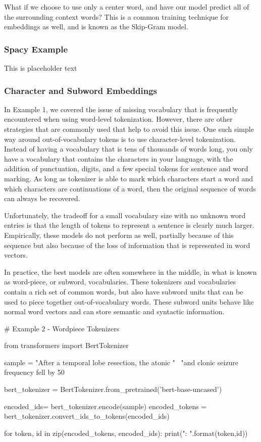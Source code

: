 What if we choose to use only a center word, and have our model predict all of the surrounding context words?
This is a common training technique for embeddings as well, and is known as the Skip-Gram model.

\subsubsection{Spacy Example}
This is placeholder text

\subsubsection{Character and Subword Embeddings}

In Example 1, we covered the issue of missing vocabulary that is frequently encountered when using word-level tokenization.
However, there are other strategies that are commonly used that help to avoid this issue.
One such simple way around out-of-vocabulary tokens is to use character-level tokenization.
Instead of having a vocabulary that is tens of thousands of words long, you only have a vocabulary that contains the characters in
your language, with the addition of punctuation, digits, and a few special tokens for sentence and word marking.
As long as tokenizer is able to mark which characters start a word and which characters are continuations of a word, then the original sequence of words can always be recovered.

Unfortunately, the tradeoff for a small vocabulary size with no unknown word entries is that the length of tokens to represent a sentence is clearly much larger.
Empirically, these models do not perform as well, partially because of this sequence but also because of the loss of information that is represented in word vectors.

In practice, the best models are often somewhere in the middle, in what is known as word-piece, or subword, vocabularies.
These tokenizers and vocabularies contain a rich set of common words, but also have subword units that can be used to piece together out-of-vocabulary words.
These subword units behave like normal word vectors and can store semantic and syntactic information.


\begin{python}
  # Example 2 - Wordpiece Tokenizers

  from transformers import BertTokenizer

  sample = "After a temporal lobe resection, the atonic " \
           "and clonic seizure frequency fell by 50%

  bert_tokenizer = BertTokenizer.from_pretrained('bert-base-uncased')

  encoded_ids= bert_tokenizer.encode(sample)
  encoded_tokens = bert_tokenizer.convert_ids_to_tokens(encoded_ids)

  for token, id  in zip(encoded_tokens, encoded_ids):
    print("{}: {}".format(token,id))
\end{python}

